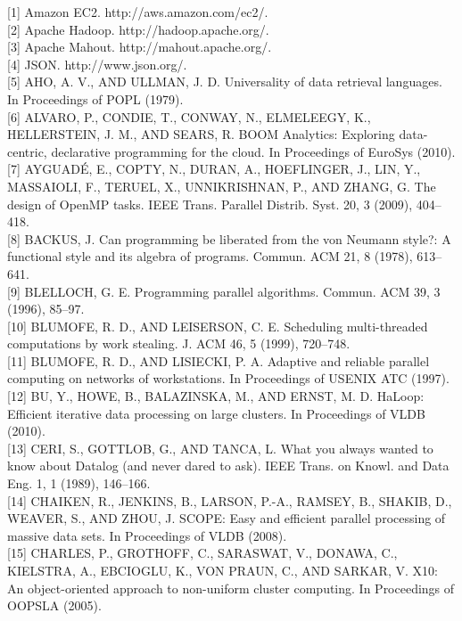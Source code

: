 \documentclass[
]{article}
\begin{document}
{[}1{]} Amazon EC2. http://aws.amazon.com/ec2/.\\
{[}2{]} Apache Hadoop. http://hadoop.apache.org/.\\
{[}3{]} Apache Mahout. http://mahout.apache.org/.\\
{[}4{]} JSON. http://www.json.org/.\\
{[}5{]} AHO, A. V., AND ULLMAN, J. D. Universality of data retrieval
languages. In Proceedings of POPL (1979).\\
{[}6{]} ALVARO, P., CONDIE, T., CONWAY, N., ELMELEEGY, K., HELLERSTEIN,
J. M., AND SEARS, R. BOOM Analytics: Exploring data-centric, declarative
programming for the cloud. In Proceedings of EuroSys (2010).\\
{[}7{]} AYGUADÉ, E., COPTY, N., DURAN, A., HOEFLINGER, J., LIN, Y.,
MASSAIOLI, F., TERUEL, X., UNNIKRISHNAN, P., AND ZHANG, G. The design of
OpenMP tasks. IEEE Trans. Parallel Distrib. Syst. 20, 3 (2009),
404--418.\\
{[}8{]} BACKUS, J. Can programming be liberated from the von Neumann
style?: A functional style and its algebra of programs. Commun. ACM 21,
8 (1978), 613--641.\\
{[}9{]} BLELLOCH, G. E. Programming parallel algorithms. Commun. ACM 39,
3 (1996), 85--97.\\
{[}10{]} BLUMOFE, R. D., AND LEISERSON, C. E. Scheduling multi-threaded
computations by work stealing. J. ACM 46, 5 (1999), 720--748.\\
{[}11{]} BLUMOFE, R. D., AND LISIECKI, P. A. Adaptive and reliable
parallel computing on networks of workstations. In Proceedings of USENIX
ATC (1997).\\
{[}12{]} BU, Y., HOWE, B., BALAZINSKA, M., AND ERNST, M. D. HaLoop:
Efficient iterative data processing on large clusters. In Proceedings of
VLDB (2010).\\
{[}13{]} CERI, S., GOTTLOB, G., AND TANCA, L. What you always wanted to
know about Datalog (and never dared to ask). IEEE Trans. on Knowl. and
Data Eng. 1, 1 (1989), 146--166.\\
{[}14{]} CHAIKEN, R., JENKINS, B., LARSON, P.-A., RAMSEY, B., SHAKIB,
D., WEAVER, S., AND ZHOU, J. SCOPE: Easy and efficient parallel
processing of massive data sets. In Proceedings of VLDB (2008).\\
{[}15{]} CHARLES, P., GROTHOFF, C., SARASWAT, V., DONAWA, C., KIELSTRA,
A., EBCIOGLU, K., VON PRAUN, C., AND SARKAR, V. X10: An object-oriented
approach to non-uniform cluster computing. In Proceedings of OOPSLA
(2005).\\
\end{document}
